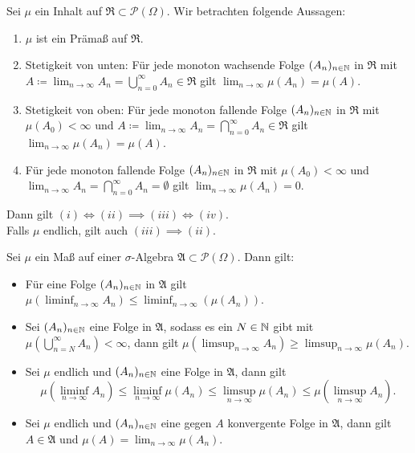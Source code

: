 \documentclass{cheat-sheet}
\newcommand{\PS}{\mathcal{P}} %
\newcommand{\PSO}{\PS(\Omega)} %
\newcommand{\Alg}{\mathfrak{A}}
\newcommand{\Ring}{\mathfrak{R}}
\begin{document}
\begin{satz}
  Sei $\mu$ ein Inhalt auf $\Ring \subset \PSO$. Wir betrachten folgende Aussagen:

  \begin{enumerate}[label=(\roman*),leftmargin=2em]
    \item $\mu$ ist ein Prämaß auf $\Ring$.
    \item Stetigkeit von unten: Für jede monoton wachsende Folge $(A_n)_{n \in \mathbb{N}}$ in $\Ring$ mit $A \coloneqq \lim_{n \to \infty} A_n = \bigcup_{n = 0}^\infty A_n \in \Ring$ gilt $\lim_{n \to \infty} \mu(A_n) = \mu(A)$.
    \item Stetigkeit von oben: Für jede monoton fallende Folge $(A_n)_{n \in \mathbb{N}}$ in $\Ring$ mit $\mu(A_0) < \infty$ und $A \coloneqq \lim_{n \to \infty} A_n = \bigcap_{n = 0}^\infty A_n \in \Ring$ gilt $\lim_{n \to \infty} \mu(A_n) = \mu(A)$.
    \item Für jede monoton fallende Folge $(A_n)_{n \in \mathbb{N}}$ in $\Ring$ mit $\mu(A_0) < \infty$ und $\lim_{n \to \infty} A_n = \bigcap_{n = 0}^\infty A_n = \emptyset$ gilt $\lim_{n \to \infty} \mu(A_n) = 0$.
  \end{enumerate}

  Dann gilt $(i) \iff (ii) \implies (iii) \iff (iv)$.\\
  Falls $\mu$ endlich, gilt auch $(iii) \implies (ii)$.
\end{satz}

\begin{satz}
  Sei $\mu$ ein Maß auf einer $\sigma$-Algebra $\Alg \subset \PSO$. Dann gilt:
  \begin{itemize}
    \item Für eine Folge $(A_n)_{n \in \mathbb{N}}$ in $\Alg$ gilt $\mu\left(\liminf_{n \to \infty} A_n\right) \leq \liminf_{n \to \infty}(\mu(A_n))$.
    \item Sei $(A_n)_{n \in \mathbb{N}}$ eine Folge in $\Alg$, sodass es ein $N \in \mathbb{N}$ gibt mit $\mu\left(\bigcup_{n = N}^\infty A_n \right) < \infty$, dann gilt $\mu\left(\limsup_{n \to \infty} A_n \right) \geq \limsup_{n \to \infty} \mu(A_n)$.
    \item Sei $\mu$ endlich und $(A_n)_{n \in \mathbb{N}}$ eine Folge in $\Alg$, dann gilt
    \[ \mu\left(\liminf_{n \to \infty} A_n\right) \leq \liminf_{n \to \infty} \mu(A_n) \leq \limsup_{n \to \infty} \mu(A_n) \leq \mu\left(\limsup_{n \to \infty} A_n\right). \]
    \item Sei $\mu$ endlich und $(A_n)_{n \in \mathbb{N}}$ eine gegen $A$ konvergente Folge in $\Alg$, dann gilt $A \in \Alg$ und $\mu(A) = \lim_{n \to \infty} \mu(A_n)$.
  \end{itemize}
\end{satz}
\end{document}
